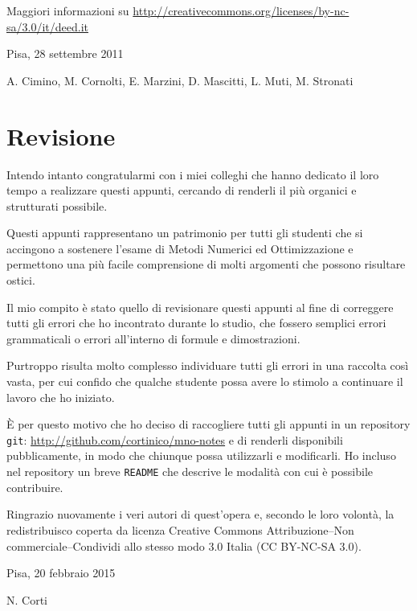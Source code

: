 Maggiori informazioni su \url{http://creativecommons.org/licenses/by-nc-sa/3.0/it/deed.it}

\vspace{1cm}
\begin{flushright}
Pisa, 28 settembre 2011
\end{flushright}

\vfill
\byncsa A. Cimino, M. Cornolti, E. Marzini, D. Mascitti, L. Muti, M. Stronati

\chapter*{Revisione}

Intendo intanto congratularmi con i miei colleghi che hanno dedicato il loro tempo a realizzare questi appunti, cercando di renderli il pi\`u organici e strutturati possibile.

Questi appunti rappresentano un patrimonio per tutti gli studenti che si accingono a sostenere l'esame di Metodi Numerici ed Ottimizzazione e permettono una pi\`u facile comprensione di molti argomenti che possono risultare ostici.

Il mio compito \`e stato quello di revisionare questi appunti al fine di correggere tutti gli errori che ho incontrato durante lo studio, che fossero semplici errori grammaticali o errori all'interno di formule e dimostrazioni.

Purtroppo risulta molto complesso individuare tutti gli errori in una raccolta cos\`i vasta, per cui confido che qualche studente possa avere lo stimolo a continuare il lavoro che ho iniziato.

\`E per questo motivo che ho deciso di raccogliere tutti gli appunti in un repository \texttt{git}: \url{http://github.com/cortinico/mno-notes}
e di renderli disponibili pubblicamente, in modo che chiunque possa utilizzarli e modificarli. Ho incluso nel repository un breve \texttt{README} che descrive le modalit\`a con cui \`e possibile contribuire.

Ringrazio nuovamente i veri autori di quest'opera e, secondo le loro volont\`a, la redistribuisco coperta da licenza Creative Commons Attribuzione--Non commerciale--Condividi allo stesso modo 3.0 Italia (CC BY-NC-SA 3.0).

\vspace{1cm}
\begin{flushright}
Pisa, 20 febbraio 2015
\end{flushright}

\vfill
\byncsa N. Corti

